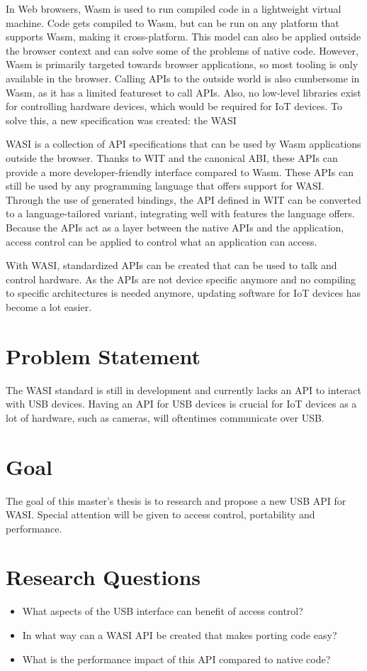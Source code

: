 In Web browsers, \acrfull{Wasm} is used to run compiled code in a lightweight virtual machine. Code gets compiled to \acrshort{Wasm}, but can be run on any platform that supports \acrshort{Wasm}, making it cross-platform. This model can also be applied outside the browser context and can solve some of the problems of native code. However, \acrshort{Wasm} is primarily targeted towards browser applications, so most tooling is only available in the browser. Calling APIs to the outside world is also cumbersome in Wasm, as it has a limited featureset to call APIs. Also, no low-level libraries exist for controlling hardware devices, which would be required for \acrshort{IoT} devices. To solve this, a new specification was created: the \acrfull{WASI}

\acrshort{WASI} is a collection of API specifications that can be used by \acrshort{Wasm} applications outside the browser. Thanks to \acrfull{WIT} and the canonical ABI, these APIs can provide a more developer-friendly interface compared to Wasm. These APIs can still be used by any programming language that offers support for WASI. Through the use of generated bindings, the API defined in \acrfull{WIT} can be converted to a language-tailored variant, integrating well with features the language offers. Because the APIs act as a layer between the native APIs and the application, access control can be applied to control what an application can access. 

With \acrshort{WASI}, standardized APIs can be created that can be used to talk and control hardware. As the APIs are not device specific anymore and no compiling to specific architectures is needed anymore, updating software for \acrshort{IoT} devices has become a lot easier.

\section*{Problem Statement}

The \acrshort{WASI} standard is still in development and currently lacks an API to interact with USB devices. Having an API for USB devices is crucial for \acrshort{IoT} devices as a lot of hardware, such as cameras, will oftentimes communicate over USB.

\section*{Goal}

The goal of this master's thesis is to research and propose a new USB API for \acrshort{WASI}. Special attention will be given to access control, portability and performance.

\section*{Research Questions}

\begin{itemize}

\item What aspects of the USB interface can benefit of access control?

\item In what way can a WASI API be created that makes porting code easy?

\item What is the performance impact of this API compared to native code?

\end{itemize}

